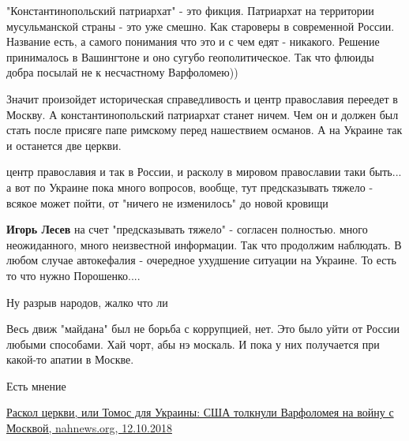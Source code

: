 \begin{itemize}
\begin{itemize} %

"Константинопольский патриархат" - это фикция. Патриархат на территории
мусульманской страны - это уже смешно. Как староверы в современной России.
Название есть, а самого понимания что это и с чем едят - никакого. Решение
принималось в Вашингтоне и оно сугубо геополитическое. Так что флюиды добра
посылай не к несчастному Варфоломею))


Значит произойдет историческая справедливость и центр православия переедет в
Москву. А константинопольский патриархат станет ничем. Чем он и должен был
стать после присяге папе римскому перед нашествием османов. А на Украине так и
останется две церкви.


центр православия и так в России, и расколу в мировом православии таки быть...
а вот по Украине пока много вопросов, вообще, тут предсказывать тяжело - всякое
может пойти, от "ничего не изменилось" до новой кровищи

\textbf{Игорь Лесев} на счет "предсказывать тяжело" - согласен полностью. много неожиданного, много неизвестной информации. Так что продолжим наблюдать. В любом случае автокефалия - очередное ухудшение ситуации на Украине. То есть то что нужно Порошенко....
\end{itemize} %

Ну разрыв народов, жалко что ли


Весь движ "майдана" был не борьба с коррупцией, нет. Это было уйти от России
любыми способами. Хай чорт, абы нэ москаль. И пока у них получается при
какой-то апатии в Москве.

Есть мнение

\href{https://nahnews.org/1006988-ukrainskii-raskol-cerkvi-ili-kievskaya-avtokefaliya-ssha-tolknuli-varfolomeya-na-voinu-s-moskvoi}{%
Раскол церкви, или Томос для Украины: США толкнули Варфоломея на войну с Москвой, nahnews.org, 12.10.2018%
}


\end{itemize} %
